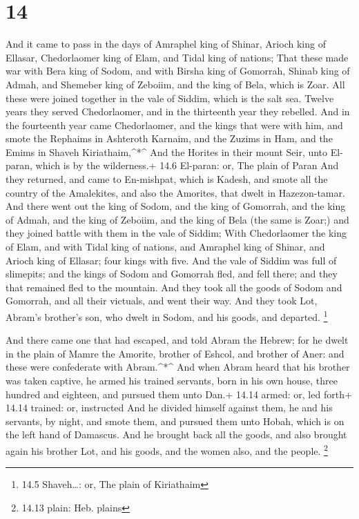 \hypertarget{section-13}{%
\section{14}\label{section-13}}

 And it came to pass in the days of Amraphel king of Shinar,
Arioch king of Ellasar, Chedorlaomer king of Elam, and Tidal king of
nations;  That these made war with Bera king of Sodom, and
with Birsha king of Gomorrah, Shinab king of Admah, and Shemeber king of
Zeboiim, and the king of Bela, which is Zoar.  All these
were joined together in the vale of Siddim, which is the salt sea.
 Twelve years they served Chedorlaomer, and in the
thirteenth year they rebelled.  And in the fourteenth year
came Chedorlaomer, and the kings that were with him, and smote the
Rephaims in Ashteroth Karnaim, and the Zuzims in Ham, and the Emims in
Shaveh Kiriathaim,\^{}*\^{}  And the Horites in their mount
Seir, unto El-paran, which is by the wilderness.+ 14.6 El-paran: or, The
plain of Paran  And they returned, and came to En-mishpat,
which is Kadesh, and smote all the country of the Amalekites, and also
the Amorites, that dwelt in Hazezon-tamar.  And there went
out the king of Sodom, and the king of Gomorrah, and the king of Admah,
and the king of Zeboiim, and the king of Bela (the same is Zoar;) and
they joined battle with them in the vale of Siddim;  With
Chedorlaomer the king of Elam, and with Tidal king of nations, and
Amraphel king of Shinar, and Arioch king of Ellasar; four kings with
five.  And the vale of Siddim was full of slimepits; and
the kings of Sodom and Gomorrah fled, and fell there; and they that
remained fled to the mountain.  And they took all the goods
of Sodom and Gomorrah, and all their victuals, and went their way.
 And they took Lot, Abram's brother's son, who dwelt in
Sodom, and his goods, and departed. \footnote{14.5 Shaveh\ldots: or, The
  plain of Kiriathaim}

 And there came one that had escaped, and told Abram the
Hebrew; for he dwelt in the plain of Mamre the Amorite, brother of
Eshcol, and brother of Aner: and these were confederate with
Abram.\^{}*\^{}  And when Abram heard that his brother was
taken captive, he armed his trained servants, born in his own house,
three hundred and eighteen, and pursued them unto Dan.+ 14.14 armed: or,
led forth+ 14.14 trained: or, instructed  And he divided
himself against them, he and his servants, by night, and smote them, and
pursued them unto Hobah, which is on the left hand of Damascus.
 And he brought back all the goods, and also brought again
his brother Lot, and his goods, and the women also, and the people.
\footnote{14.13 plain: Heb. plains}


